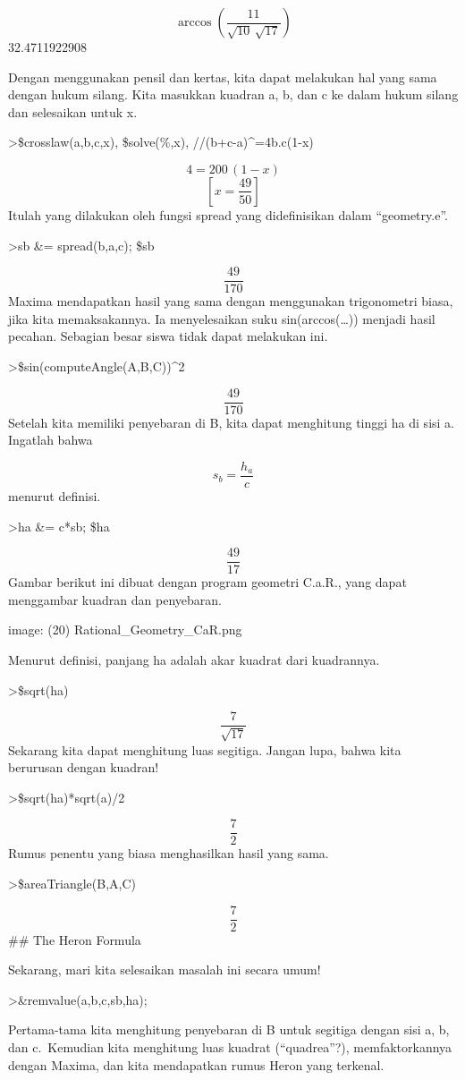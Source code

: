 \documentclass[
]{book}
\begin{document}
\[\arccos \left(\frac{11}{\sqrt{10}\,\sqrt{17}}\right)\] 32.4711922908

Dengan menggunakan pensil dan kertas, kita dapat melakukan hal yang sama dengan hukum silang. Kita masukkan kuadran a, b, dan c ke dalam hukum silang dan selesaikan untuk x.

\textgreater\$crosslaw(a,b,c,x), \$solve(\%,x), //(b+c-a)\^{}=4b.c(1-x)

\[4=200\,\left(1-x\right)\]\[\left[ x=\frac{49}{50} \right] \]Itulah yang dilakukan oleh fungsi spread yang didefinisikan dalam ``geometry.e''.

\textgreater sb \&= spread(b,a,c); \$sb

\[\frac{49}{170}\]Maxima mendapatkan hasil yang sama dengan menggunakan trigonometri biasa, jika kita memaksakannya. Ia menyelesaikan suku sin(arccos(\ldots)) menjadi hasil pecahan. Sebagian besar siswa tidak dapat melakukan ini.

\textgreater\$sin(computeAngle(A,B,C))\^{}2

\[\frac{49}{170}\]Setelah kita memiliki penyebaran di B, kita dapat menghitung tinggi ha di sisi a. Ingatlah bahwa

\[s_b=\frac{h_a}{c}\]menurut definisi.

\textgreater ha \&= c*sb; \$ha

\[\frac{49}{17}\]Gambar berikut ini dibuat dengan program geometri C.a.R., yang dapat menggambar kuadran dan penyebaran.

image: (20) Rational\_Geometry\_CaR.png

Menurut definisi, panjang ha adalah akar kuadrat dari kuadrannya.

\textgreater\$sqrt(ha)

\[\frac{7}{\sqrt{17}}\]Sekarang kita dapat menghitung luas segitiga. Jangan lupa, bahwa kita berurusan dengan kuadran!

\textgreater\$sqrt(ha)*sqrt(a)/2

\[\frac{7}{2}\]Rumus penentu yang biasa menghasilkan hasil yang sama.

\textgreater\$areaTriangle(B,A,C)

\[\frac{7}{2}\]\#\# The Heron Formula

Sekarang, mari kita selesaikan masalah ini secara umum!

\textgreater\&remvalue(a,b,c,sb,ha);

Pertama-tama kita menghitung penyebaran di B untuk segitiga dengan sisi a, b, dan c.~Kemudian kita menghitung luas kuadrat (``quadrea''?), memfaktorkannya dengan Maxima, dan kita mendapatkan rumus Heron yang terkenal.
\end{document}

